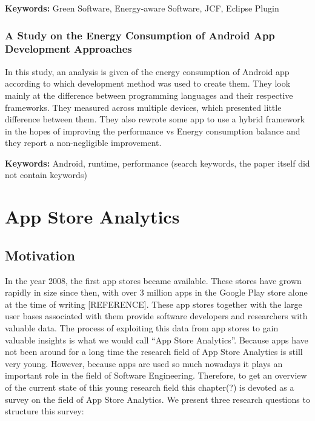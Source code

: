 \documentclass[]{book}
\begin{document}
\textbf{Keywords:} Green Software, Energy-aware Software, JCF, Eclipse
Plugin

\subsection{A Study on the Energy Consumption of Android App Development
Approaches}\label{a-study-on-the-energy-consumption-of-android-app-development-approaches}

In this study, an analysis is given of the energy consumption of Android
app according to which development method was used to create them. They
look mainly at the difference between programming languages and their
respective frameworks. They measured across multiple devices, which
presented little difference between them. They also rewrote some app to
use a hybrid framework in the hopes of improving the performance vs
Energy consumption balance and they report a non-negligible improvement.

\textbf{Keywords:} Android, runtime, performance (search keywords, the
paper itself did not contain keywords)

\chapter{App Store Analytics}\label{app-store-analytics}

\section{Motivation}\label{motivation-5}

In the year 2008, the first app stores became available. These stores
have grown rapidly in size since then, with over 3 million apps in the
Google Play store alone at the time of writing {[}REFERENCE{]}. These
app stores together with the large user bases associated with them
provide software developers and researchers with valuable data. The
process of exploiting this data from app stores to gain valuable
insights is what we would call ``App Store Analytics''. Because apps
have not been around for a long time the research field of App Store
Analytics is still very young. However, because apps are used so much
nowadays it plays an important role in the field of Software
Engineering. Therefore, to get an overview of the current state of this
young research field this chapter(?) is devoted as a survey on the field
of App Store Analytics. We present three research questions to structure
this survey:
\end{document}
